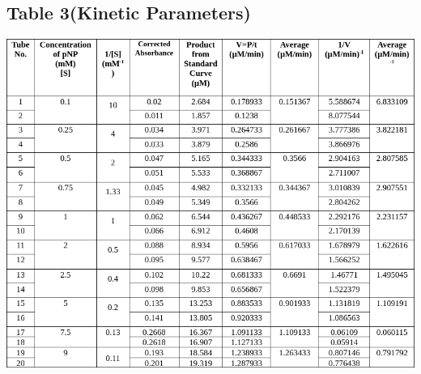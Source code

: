 \documentclass[12pt]{article}
\theoremstyle{definition}
\theoremstyle{definition}
\theoremstyle{remark}
\begin{document}
\subsection{Table 3(Kinetic Parameters)}
\begin{center}
    \includegraphics[width = 6.0in]{Pasted image 3.png}
\end{center}
\end{document}
